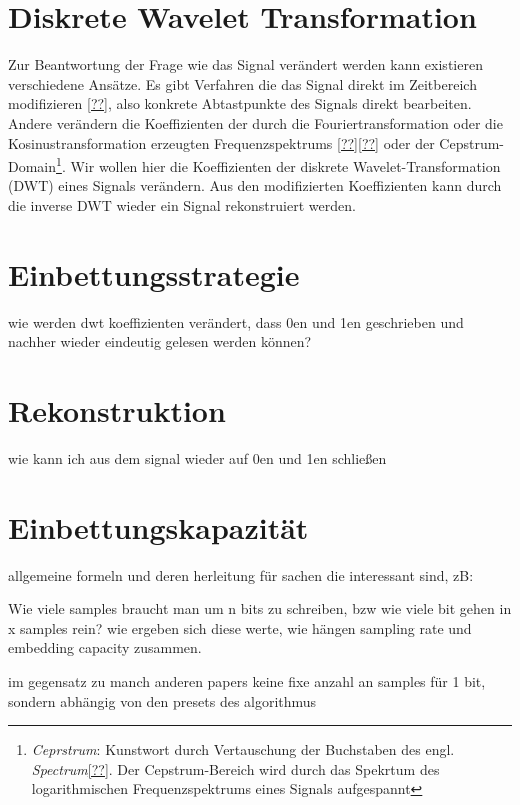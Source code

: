 \section{Diskrete Wavelet Transformation}  
	
	Zur Beantwortung der Frage wie das Signal ver\"andert werden kann existieren verschiedene Ans\"atze. Es gibt Verfahren die das Signal direkt im Zeitbereich modifizieren \ref{??}, also konkrete Abtastpunkte des Signals direkt bearbeiten. Andere ver\"andern die Koeffizienten der durch die Fouriertransformation oder die Kosinustransformation erzeugten Frequenzspektrums \ref{??}\ref{??} oder der Cepstrum-Domain\footnote{\textit{Ceprstrum}: Kunstwort durch Vertauschung der Buchstaben des engl. \textit{Spectrum}\ref{??}. Der Cepstrum-Bereich wird durch das Spekrtum des logarithmischen Frequenzspektrums eines Signals aufgespannt}. Wir wollen hier die Koeffizienten der diskrete Wavelet-Transformation (DWT) eines Signals ver\"andern. Aus den modifizierten Koeffizienten kann durch die inverse DWT wieder ein Signal rekonstruiert werden. 

\section{Einbettungsstrategie}

wie werden dwt koeffizienten ver\"andert, dass 0en und 1en geschrieben und nachher wieder eindeutig gelesen werden k\"onnen?

\section{Rekonstruktion}

wie kann ich aus dem signal wieder auf 0en und 1en schlie{\ss}en

\section{Einbettungskapazit\"at}

allgemeine formeln und deren herleitung f\"ur sachen die interessant sind, zB:

Wie viele samples braucht man um n bits zu schreiben, bzw wie viele bit gehen in x samples rein? wie ergeben sich diese werte, wie h\"angen sampling rate und embedding capacity zusammen. 

im gegensatz zu manch anderen papers keine fixe anzahl an samples f\"ur 1 bit, sondern abh\"angig von den presets des algorithmus





